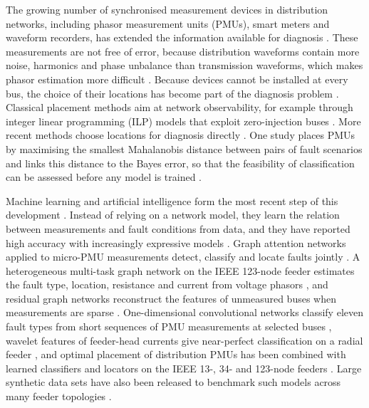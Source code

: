 \documentclass[11pt]{article}
\newenvironment{nw}{}{}
\begin{document}
\begin{nw}
The growing number of synchronised measurement devices in distribution networks, including phasor measurement units (PMUs), smart meters and waveform recorders, has extended the information available for diagnosis \cite{rasoulnia2026comprehensive}. These measurements are not free of error, because distribution waveforms contain more noise, harmonics and phase unbalance than transmission waveforms, which makes phasor estimation more difficult \cite{pandey2025novel}. Because devices cannot be installed at every bus, the choice of their locations has become part of the diagnosis problem \cite{anguswamy2025holistic}. Classical placement methods aim at network observability, for example through integer linear programming (ILP) models that exploit zero-injection buses \cite{chao2026phased}. More recent methods choose locations for diagnosis directly \cite{kaliuzhnyi2027statistical,khattak2025}. One study places PMUs by maximising the smallest Mahalanobis distance between pairs of fault scenarios and links this distance to the Bayes error, so that the feasibility of classification can be assessed before any model is trained \cite{kaliuzhnyi2027statistical}.

Machine learning and artificial intelligence form the most recent step of this development \cite{oelhaf2025}. Instead of relying on a network model, they learn the relation between measurements and fault conditions from data, and they have reported high accuracy with increasingly expressive models \cite{ngo2025deep,oelhaf2025}. Graph attention networks applied to micro-PMU measurements detect, classify and locate faults jointly \cite{ngo2025deep}. A heterogeneous multi-task graph network on the IEEE 123-node feeder estimates the fault type, location, resistance and current from voltage phasors \cite{chanda2025heterogeneous}, and residual graph networks reconstruct the features of unmeasured buses when measurements are sparse \cite{sun2026fault}. One-dimensional convolutional networks classify eleven fault types from short sequences of PMU measurements at selected buses \cite{khattak2025}, wavelet features of feeder-head currents give near-perfect classification on a radial feeder \cite{mamuya2020}, and optimal placement of distribution PMUs has been combined with learned classifiers and locators on the IEEE 13-, 34- and 123-node feeders \cite{anguswamy2025holistic}. Large synthetic data sets have also been released to benchmark such models across many feeder topologies \cite{chen2026large}.


\end{nw}
\end{document}
